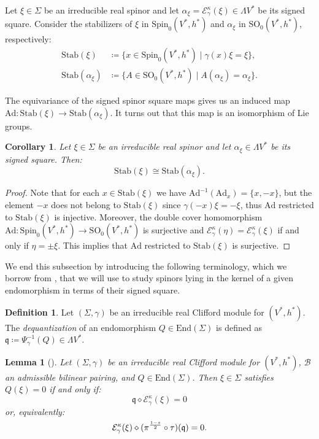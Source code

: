 \documentclass[10pt,reqno]{amsart}
\newtheorem{lemma}[theorem]{Lemma}
\newtheorem{corollary}[theorem]{Corollary}
\theoremstyle{definition}
\newtheorem{definition}[theorem]{Definition}
\theoremstyle{remark}
\newcommand{\End}{\mathrm{End}}
\begin{document}
Let $\xi\in\Sigma$ be an irreducible real spinor and let $\alpha_\xi=\mathcal{E}^\kappa_\gamma(\xi)\in\Lambda V^*$ be its signed square. Consider the stabilizers of $\xi$ in $\mathrm{Spin}_0(V^*,h^*)$ and $\alpha_\xi$ in $\mathrm{SO}_0(V^*,h^*)$, respectively: \begin{align*}
    \mathrm{Stab}(\xi)&\coloneqq\{x\in\mathrm{Spin}_0(V^*,h^*)\mid\gamma(x)\xi=\xi\},\\
    \mathrm{Stab}(\alpha_\xi)&\coloneqq\{A\in\mathrm{SO}_0(V^*,h^*)\mid A(\alpha_\xi)=\alpha_\xi\}.
\end{align*}

The equivariance of the signed spinor square maps gives us an induced map $\mathrm{Ad}\colon\mathrm{Stab}(\xi)\to\mathrm{Stab}(\alpha_\xi)$. It turns out that this map is an isomorphism of Lie groups.

\begin{corollary}\label{cor:stabilizers_isomorphic}
    Let $\xi\in\Sigma$ be an irreducible real spinor and let $\alpha_\xi\in\Lambda V^*$ be its signed square. Then: $$\mathrm{Stab}(\xi)\cong\mathrm{Stab}(\alpha_\xi).$$
\end{corollary}

\begin{proof}
    Note that for each $x\in\mathrm{Stab}(\xi)$ we have $\mathrm{Ad}^{-1}(\mathrm{Ad}_x)=\{x,-x\}$, but the element $-x$ does not belong to $\mathrm{Stab}(\xi)$ since $\gamma(-x)\xi=-\xi$, thus $\mathrm{Ad}$ restricted to $\mathrm{Stab}(\xi)$ is injective. Moreover, the double cover homomorphism $\mathrm{Ad}\colon\mathrm{Spin}_0(V^*,h^*)\to\mathrm{SO}_0(V^*,h^*)$ is surjective and $\mathcal{E}^\kappa_\gamma(\eta)=\mathcal{E}^\kappa_\gamma(\xi)$ if and only if $\eta=\pm\xi$. This implies that $\mathrm{Ad}$ restricted to $\mathrm{Stab}(\xi)$ is surjective.
\end{proof}

We end this subsection by introducing the following terminology, which we borrow from \cite{Meinrenken2013}, that we will use to study spinors lying in the kernel of a given endomorphism in terms of their signed square.

\begin{definition}
    Let $(\Sigma,\gamma)$ be an irreducible real Clifford module for $(V^*,h^*)$. The \emph{dequantization} of an endomorphism $Q\in\End(\Sigma)$ is defined as $\mathfrak{q}\coloneqq\Psi_\gamma^{-1}(Q)\in\Lambda V^*$.
\end{definition}

\begin{lemma}[{\cite[Prop.\ 3.26]{Cortes_Lazaroiu_Shahbazi2021}}]\label{lemma:constrained_spinorial_forms}
    Let $(\Sigma,\gamma)$ be an irreducible real Clifford module for $(V^*,h^*)$, $\mathscr{B}$ an admissible bilinear pairing, and $Q\in\End(\Sigma)$. Then $\xi\in\Sigma$ satisfies $Q(\xi)=0$ if and only if: $$\mathfrak{q}\diamond\mathcal{E}^\kappa_\gamma(\xi)=0$$ or, equivalently: $$\mathcal{E}^\kappa_\gamma(\xi)\diamond(\pi^{\smash{{\frac{1-s}{2}}}}\circ\tau)(\mathfrak{q})=0.$$
\end{lemma}
\end{document}
